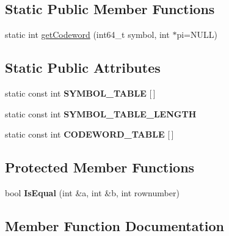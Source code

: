 \subsection*{Static Public Member Functions}
\begin{DoxyCompactItemize}
\item 
static int \mbox{\hyperlink{classzxing_1_1pdf417_1_1decoder_1_1_bit_matrix_parser_a465ff7a95aed2f3a54378511bb2dc63c}{get\+Codeword}} (int64\+\_\+t symbol, int $\ast$pi=N\+U\+LL)
\end{DoxyCompactItemize}
\subsection*{Static Public Attributes}
\begin{DoxyCompactItemize}
\item 
\mbox{\label{classzxing_1_1pdf417_1_1decoder_1_1_bit_matrix_parser_a7b90870609e2015a0b78add8145ec4d5}} 
static const int {\bfseries S\+Y\+M\+B\+O\+L\+\_\+\+T\+A\+B\+LE} \mbox{[}$\,$\mbox{]}
\item 
static const int {\bfseries S\+Y\+M\+B\+O\+L\+\_\+\+T\+A\+B\+L\+E\+\_\+\+L\+E\+N\+G\+TH}
\item 
\mbox{\label{classzxing_1_1pdf417_1_1decoder_1_1_bit_matrix_parser_a55dfc982d82dd1e359eda64d3a60e0a5}} 
static const int {\bfseries C\+O\+D\+E\+W\+O\+R\+D\+\_\+\+T\+A\+B\+LE} \mbox{[}$\,$\mbox{]}
\end{DoxyCompactItemize}
\subsection*{Protected Member Functions}
\begin{DoxyCompactItemize}
\item 
\mbox{\label{classzxing_1_1pdf417_1_1decoder_1_1_bit_matrix_parser_ac080bd1b2c5f007bb1056b735376d4e7}} 
bool {\bfseries Is\+Equal} (int \&a, int \&b, int rownumber)
\end{DoxyCompactItemize}


\subsection{Member Function Documentation}
\mbox{\label{classzxing_1_1pdf417_1_1decoder_1_1_bit_matrix_parser_a465ff7a95aed2f3a54378511bb2dc63c}} 
